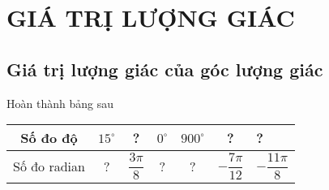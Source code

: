 \setcounter{section}{0}
\section{GIÁ TRỊ LƯỢNG GIÁC}
\subsection{Giá trị lượng giác của góc lượng giác}
\begin{bt}%
	Hoàn thành bảng sau
	\begin{center}
	\renewcommand{\arraystretch}{2}
	\begin{tabular}{|c|c|c|c|c|c|l|}
	\hline
	Số đo độ     & $15^\circ$ & ? & $0^\circ$ & $900^\circ$ & ? & ?  \\ \hline
	Số đo radian & ?  & $\dfrac{3\pi}{8}$ & ? & ?   & $-\dfrac{7\pi}{12}$ & $-\dfrac{11\pi}{8}$ \\ \hline
	\end{tabular}
	\end{center}
\end{bt}


